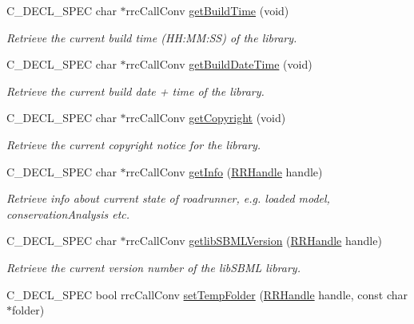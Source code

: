 \begin{DoxyCompactItemize}
C\-\_\-\-D\-E\-C\-L\-\_\-\-S\-P\-E\-C char $\ast$rrc\-Call\-Conv \hyperlink{group__utility_ga27b6009b7b7f8de5445787ad839a0246}{get\-Build\-Time} (void)
\begin{DoxyCompactList}\small\item\em Retrieve the current build time (H\-H\-:\-M\-M\-:S\-S) of the library. \end{DoxyCompactList}\item 
C\-\_\-\-D\-E\-C\-L\-\_\-\-S\-P\-E\-C char $\ast$rrc\-Call\-Conv \hyperlink{group__utility_ga372decc8acef5346f330148594844f68}{get\-Build\-Date\-Time} (void)
\begin{DoxyCompactList}\small\item\em Retrieve the current build date + time of the library. \end{DoxyCompactList}\item 
C\-\_\-\-D\-E\-C\-L\-\_\-\-S\-P\-E\-C char $\ast$rrc\-Call\-Conv \hyperlink{group__utility_ga67a7b431f66978753a8837718fd0112f}{get\-Copyright} (void)
\begin{DoxyCompactList}\small\item\em Retrieve the current copyright notice for the library. \end{DoxyCompactList}\item 
C\-\_\-\-D\-E\-C\-L\-\_\-\-S\-P\-E\-C char $\ast$rrc\-Call\-Conv \hyperlink{group__utility_ga84805d87e0b75fcaff3b7ad3d1179002}{get\-Info} (\hyperlink{rrc__types_8h_a1d68f0592372208fa5a5f2799ea4b3ae}{R\-R\-Handle} handle)
\begin{DoxyCompactList}\small\item\em Retrieve info about current state of roadrunner, e.\-g. loaded model, conservation\-Analysis etc. \end{DoxyCompactList}\item 
C\-\_\-\-D\-E\-C\-L\-\_\-\-S\-P\-E\-C char $\ast$rrc\-Call\-Conv \hyperlink{group__utility_ga2235582889c86de1bcef3c2a83631183}{getlib\-S\-B\-M\-L\-Version} (\hyperlink{rrc__types_8h_a1d68f0592372208fa5a5f2799ea4b3ae}{R\-R\-Handle} handle)
\begin{DoxyCompactList}\small\item\em Retrieve the current version number of the lib\-S\-B\-M\-L library. \end{DoxyCompactList}\item 
C\-\_\-\-D\-E\-C\-L\-\_\-\-S\-P\-E\-C bool rrc\-Call\-Conv \hyperlink{group__utility_ga40e0e9b3f96c37bad8b0313eddf6caed}{set\-Temp\-Folder} (\hyperlink{rrc__types_8h_a1d68f0592372208fa5a5f2799ea4b3ae}{R\-R\-Handle} handle, const char $\ast$folder)

\end{DoxyCompactItemize}
